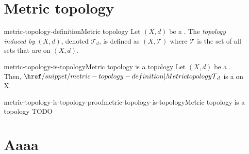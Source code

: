 \documentclass[preview]{standalone}
\begin{document}
\genpage

\newcommand\ts{{(X, \mathcal{T})}}

\section{Metric topology}

\begin{snippetdefinition}{metric-topology-definition}{Metric topology}
    Let \((X, d)\) be a \metricspace. The \textit{topology induced by} \((X, d)\),
    denoted \(\mathcal{T}_d\), is defined as \((X, \mathcal{T})\)
    where \(\mathcal{T}\) is the set of all sets that are \msopenset on \((X, d)\).
\end{snippetdefinition}

\begin{snippetproposition}{metric-topology-is-topology}{Metric topology is a topology}
    Let \((X, d)\) be a \metricspace. Then, \(\metrictopology_d\) is a \topologicalspace[topology][Topology]
    on X.
\end{snippetproposition}

\begin{snippetproof}{metric-topology-is-topology-proof}{metric-topology-is-topology}{Metric topology is a topology}
    TODO
\end{snippetproof}

\section{Aaaa}

\end{document}
